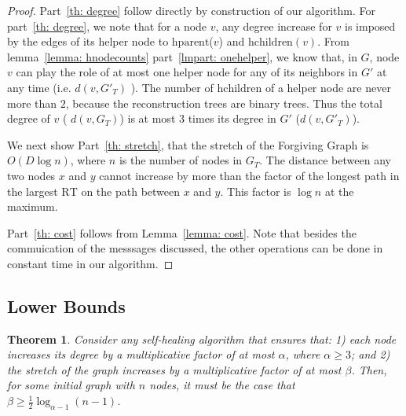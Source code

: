 \documentclass[11pt, letter]{article}
\newtheorem{theorem}{Theorem}
\newcommand{\RT}{\mathrm{RT}}
\newcommand{\hparent}{\mathrm{hparent}}
\newcommand{\hchildren}{\mathrm{hchildren}}
\begin{document}
\begin{proof}
 Part~\ref{th: degree} follow directly by construction of our algorithm.  For part~\ref{th: degree}, we note that for a
node $v$, any degree increase for $v$ is imposed by the  edges of its helper node to $\hparent$($v$) and $\hchildren(v)$. From lemma~\ref{lemma: hnodecounts} part~\ref{lmpart:
onehelper}, we know that, in $G$, node $v$ can play the role of at most one helper node for any of its neighbors in
$G'$ at  any time (i.e. $d(v,G'_{T})$ ).
The number of $\hchildren$ of a helper node are never more than $2$, because the reconstruction trees are binary trees. 
Thus the total degree of $v$ ( $d(v,G_{T})$) is at most $3$ times its degree in $G'$ ($d(v,G'_{T})$). 



We next show Part~\ref{th: stretch}, that the stretch of the Forgiving Graph is  $O(D \log n)$, where $n$ is the number
of nodes in $G_{T}$. The distance between any two nodes $x$ and $y$ cannot increase by more than the factor of the
longest path in the largest $\RT$ on the path between $x$ and $y$. This factor is $\log n$ at the maximum.

 Part~\ref{th: cost} follows from Lemma~\ref{lemma: cost}. Note that besides the commuication of the messsages
discussed, the other operations can be done in constant time in our algorithm.
 
\end{proof}

\pagebreak

\subsection{Lower Bounds}

\label{subsec: lowerbounds}

\begin{theorem}
Consider any self-healing algorithm that ensures that: 1) each node increases its degree by a multiplicative factor of 
at most $\alpha$, where $\alpha \geq 3$; and 2) the stretch of the graph
increases by a multiplicative factor of at most $\beta$. Then, for some initial graph with $n$ nodes, it must be the case that
 $\beta \geq \frac{1}{2} \log_{\alpha-1}( n - 1)$.
\end{theorem}
\end{document}

